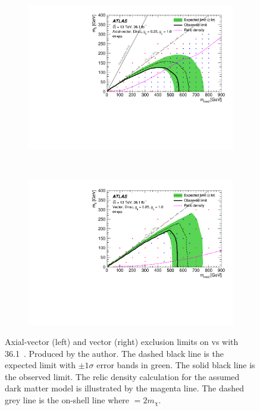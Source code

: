 \begin{figure}[!htb]
    \centering
    \begin{subfigure}[b]{0.48\textwidth}
        \includegraphics[width=\textwidth]{Figures/limits_dmA.pdf}
        \label{fig:limits_dmA}
    \end{subfigure}
    ~ %
    \begin{subfigure}[b]{0.48\textwidth}
        \includegraphics[width=\textwidth]{Figures/limits_dmV.pdf}
        \label{fig:limits_dmV}
    \end{subfigure}
    \caption{Axial-vector (left) and vector (right) exclusion limits on \mchi vs \mmed with 36.1~\ifb \cite{Aaboud:2017bja}. Produced by the author. The dashed black line is the expected limit with $\pm 1 \sigma$ error bands in green. The solid black line is the observed limit. The relic density calculation for the assumed dark matter model is illustrated by the magenta line. The dashed grey line is the on-shell line where \mmed $= 2 m_\chi$.}
\label{fig:limits}
\end{figure}

